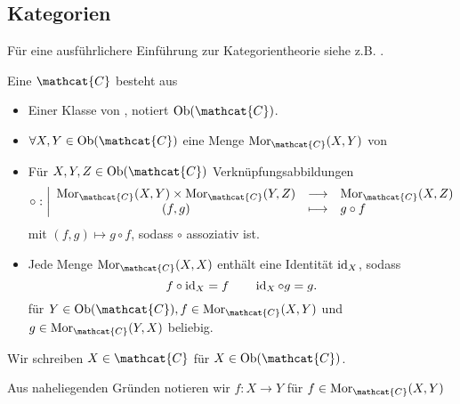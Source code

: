 \subsection{Kategorien}

\begin{remark*}
    Für eine ausführlichere Einführung zur Kategorientheorie siehe z.B. \cite{category-theory}.
\end{remark*}

\begin{definition}[Kategorie]\label{def:kategorie}
    Eine  $\mathcat{C}$ besteht aus
    \begin{itemize}
        \item Einer Klasse von , notiert $\Ob(\mathcat{C})$.
        \item $\forall X,Y \in \Ob(\mathcat{C})$ eine Menge $\Mor_{\mathcat{C}}(X,Y)$ von 
        \item Für $X,Y,Z \in \Ob(\mathcat{C})$ Verknüpfungsabbildungen
                \begin{equation*}
                \circ : \left| \begin{array}{c c l} 
                    \Mor_{\mathcat{C}}(X,Y)\times \Mor_{\mathcat{C}}(Y,Z) & \longrightarrow & \Mor_{\mathcat{C}}(X,Z) \\
                    (f,g) & \longmapsto &  g\circ f
                \end{array} \right.
            \end{equation*}
            mit $(f,g) \mapsto g\circ f$, sodass $\circ $ assoziativ ist.
        \item Jede Menge $\Mor_{\mathcat{C}}(X,X)$ enthält eine Identität $\operatorname{id}_{X}$, sodass 
            \[
                f \circ  \operatorname{id}_{X} = f \qquad \operatorname{id}_X \circ  g = g
            .\] 
            für $Y\in \Ob(\mathcat{C}), f\in \Mor_{\mathcat{C}}(X,Y)$ und $g\in \Mor_{\mathcat{C}}(Y,X)$ beliebig. 
    \end{itemize}
\end{definition}

\begin{abuse*}
    Wir schreiben $X\in \mathcat{C}$ für $X\in \Ob(\mathcat{C})$.
\end{abuse*}

\begin{notation**}
    Aus naheliegenden Gründen notieren wir $f: X \to Y$ für $f\in \Mor_{\mathcat{C}}(X,Y)$
\end{notation**}

